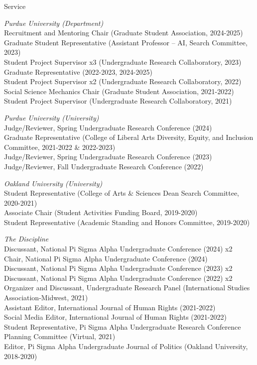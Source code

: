 \documentclass{resume} %
\begin{document}
\begin{rSection}{Service}

{\it Purdue University (Department)}  \\
Recruitment and Mentoring Chair (Graduate Student Association, 2024-2025)
\\Graduate Student Representative (Assistant Professor -- AI, Search Committee, 2023)
\\Student Project Supervisor x3 (Undergraduate Research Collaboratory, 2023)
\\Graduate Representative (2022-2023, 2024-2025) 
\\Student Project Supervisor x2 (Undergraduate Research Collaboratory, 2022)
\\Social Science Mechanics Chair (Graduate Student Association, 2021-2022)
\\Student Project Supervisor (Undergraduate Research Collaboratory, 2021)

{\it Purdue University (University)} 
\\Judge/Reviewer, Spring Undergraduate Research Conference (2024)
\\Graduate Representative (College of Liberal Arts Diversity, Equity, and Inclusion Committee, 2021-2022 \& 2022-2023)
\\Judge/Reviewer, Spring Undergraduate Research Conference (2023)
\\Judge/Reviewer, Fall Undergraduate Research Conference (2022)

{\it Oakland University (University)} 
\\Student Representative (College of Arts \& Sciences Dean Search Committee, 2020-2021)
\\Associate Chair (Student Activities Funding Board, 2019-2020)
\\Student Representative (Academic Standing and Honors Committee, 2019-2020)


{\it The Discipline} 
\\Discussant, National Pi Sigma Alpha Undergraduate Conference (2024) x2
\\Chair, National Pi Sigma Alpha Undergraduate Conference (2024)
\\Discussant, National Pi Sigma Alpha Undergraduate Conference (2023) x2
\\Discussant, National Pi Sigma Alpha Undergraduate Conference (2022) x2
\\Organizer and Discussant, Undergraduate Research Panel (International Studies Association-Midwest, 2021)
\\Assistant Editor, International Journal of Human Rights (2021-2022)
\\Social Media Editor, International Journal of Human Rights (2021-2022)
\\Student Representative, Pi Sigma Alpha Undergraduate Research Conference Planning Committee (Virtual, 2021)
\\Editor, Pi Sigma Alpha Undergraduate Journal of Politics (Oakland University, 2018-2020)


\end{rSection}
\end{document}
